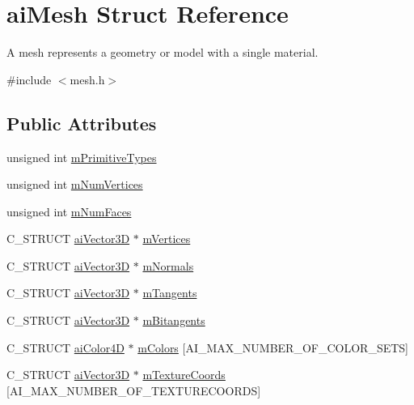 \hypertarget{structai_mesh}{\section{ai\-Mesh Struct Reference}
\label{structai_mesh}
}


A mesh represents a geometry or model with a single material.  




{\ttfamily \#include $<$mesh.\-h$>$}

\subsection*{Public Attributes}
\begin{DoxyCompactItemize}
\item 
unsigned int \hyperlink{structai_mesh_a99d66ac0a444068c1b252b30265cbf53}{m\-Primitive\-Types}
\item 
unsigned int \hyperlink{structai_mesh_ab34b7b5941e6636f1c08f615cbb072ef}{m\-Num\-Vertices}
\item 
unsigned int \hyperlink{structai_mesh_aeed22ee6963b79548f3877b3c905518e}{m\-Num\-Faces}
\item 
C\-\_\-\-S\-T\-R\-U\-C\-T \hyperlink{structai_vector3_d}{ai\-Vector3\-D} $\ast$ \hyperlink{structai_mesh_afd4588abb3e1c72821ae0234a3850662}{m\-Vertices}
\item 
C\-\_\-\-S\-T\-R\-U\-C\-T \hyperlink{structai_vector3_d}{ai\-Vector3\-D} $\ast$ \hyperlink{structai_mesh_aec81b496b4d93838cef038933dabe9b9}{m\-Normals}
\item 
C\-\_\-\-S\-T\-R\-U\-C\-T \hyperlink{structai_vector3_d}{ai\-Vector3\-D} $\ast$ \hyperlink{structai_mesh_af367ff78bd69f3e83d7edc8ad67dc5df}{m\-Tangents}
\item 
C\-\_\-\-S\-T\-R\-U\-C\-T \hyperlink{structai_vector3_d}{ai\-Vector3\-D} $\ast$ \hyperlink{structai_mesh_ab2a81bfe1731f01271ebab274a8f01c4}{m\-Bitangents}
\item 
C\-\_\-\-S\-T\-R\-U\-C\-T \hyperlink{structai_color4_d}{ai\-Color4\-D} $\ast$ \hyperlink{structai_mesh_ad9215f67bd0c2277b10775a8adb66b96}{m\-Colors} \mbox{[}A\-I\-\_\-\-M\-A\-X\-\_\-\-N\-U\-M\-B\-E\-R\-\_\-\-O\-F\-\_\-\-C\-O\-L\-O\-R\-\_\-\-S\-E\-T\-S\mbox{]}
\item 
C\-\_\-\-S\-T\-R\-U\-C\-T \hyperlink{structai_vector3_d}{ai\-Vector3\-D} $\ast$ \hyperlink{structai_mesh_a4a50b11d00ef50f419c75cab0f6bddd6}{m\-Texture\-Coords} \mbox{[}A\-I\-\_\-\-M\-A\-X\-\_\-\-N\-U\-M\-B\-E\-R\-\_\-\-O\-F\-\_\-\-T\-E\-X\-T\-U\-R\-E\-C\-O\-O\-R\-D\-S\mbox{]}

\end{DoxyCompactItemize}
